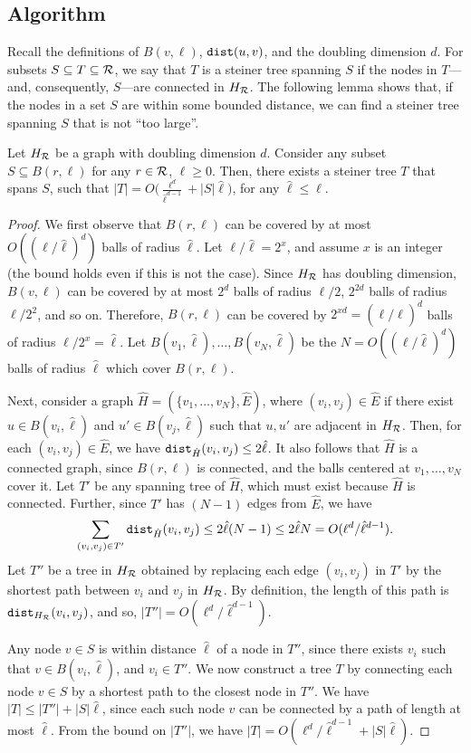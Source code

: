 \subsection{Algorithm \algosubmod{}}
Recall the definitions of $B(v, \ell)$, $\texttt{dist}(u, v)$, and the doubling dimension $d$. For subsets $S\subseteq T \subseteq \mathcal{R}$, we say that $T$ is a steiner tree spanning $S$ if the nodes in $T$---and, consequently, $S$---are connected in $H_{\mathcal{R}}$. The following lemma shows that, if the nodes in a set $S$ are within some bounded distance, we can find a steiner tree spanning $S$ that is not ``too large''.

\begin{lemma}
\label{lemma:udg}
Let $H_{\mathcal{R}}$ be a graph with doubling dimension $d$.
Consider any subset $S\subseteq B(r, \ell)$ for any $r\in\mathcal{R}$, $\ell\geq 0$.
Then, there exists a steiner tree $T$ that spans $S$, such that $|T|=O\Big(\frac{\ell^d}{\hat{\ell}^{d-1}}+|S|\hat{\ell}\Big)$, for any $\hat{\ell}\leq\ell$.
\end{lemma}
\begin{proof} 
We first observe that $B(r, \ell)$ can be covered by at most $O((\ell/\hat{\ell})^d)$ balls of radius $\hat{\ell}$. Let $\ell/\hat{\ell}=2^x$, and assume $x$ is an integer (the bound holds even if this is not the case). Since $H_{\mathcal{R}}$ has doubling dimension, $B(v, \ell)$ can be covered by at most $2^d$ balls of radius $\ell/2$, $2^{2d}$ balls of radius $\ell/2^2$, and so on. Therefore, $B(r, \ell)$ can be covered by $2^{xd}=(\ell/\hat{\ell})^d$ balls of radius $\ell/2^x=\hat{\ell}$. Let $B(v_1,\hat{\ell}),\ldots,B(v_N,\hat{\ell})$ be the $N=O((\ell/\hat{\ell})^d)$ balls of radius $\hat{\ell}$ which cover $B(r, \ell)$.

Next, consider a graph $\hat{H}=(\{v_1,\ldots,v_N\},\hat{E})$, where $(v_i, v_j)\in\hat{E}$ if there exist $u\in B(v_i, \hat{\ell})$ and $u'\in B(v_j, \hat{\ell})$ such that $u, u'$ are adjacent in $H_{\mathcal{R}}$. Then, for each $(v_i, v_j)\in \hat{E}$, we have $\texttt{dist}_{\hat{H}}(v_i, v_j)\leq 2\hat{\ell}$. 
It also follows that $\hat{H}$ is a connected graph, since $B(r, \ell)$ is connected, and the balls centered at $v_1,\ldots,v_N$ cover it. Let $T'$ be any spanning tree of $\hat{H}$, which must exist because $\hat{H}$ is connected. Further, since $T'$ has $(N-1)$ edges from $\hat{E}$, we have $$
\sum_{(v_i, v_j)\in T'}\texttt{dist}_{\hat{H}}(v_i, v_j)\leq 2\hat{\ell}(N-1)\leq 2\hat{\ell}N=O(\ell^d/\hat{\ell}^{d-1}).
$$
Let $T''$ be a tree in $H_{\mathcal{R}}$ obtained by replacing each edge $(v_i, v_j)$ in $T'$ by the shortest path between $v_i$ and $v_j$ in $H_{\mathcal{R}}$. By definition, the length of this path is $\texttt{dist}_{H_{\mathcal{R}}}(v_i, v_j)$, and so, $|T''|=O(\ell^d/\hat{\ell}^{d-1})$.

Any node $v\in S$ is within distance $\hat{\ell}$ of a node in $T''$, since there exists $v_i$ such that $v\in B(v_i, \hat{\ell})$, and $v_i\in T''$. We now construct a tree $T$ by connecting each node $v\in S$ by a shortest path to the closest node in $T''$. We have $|T|\leq |T''|+|S|\hat{\ell}$, since each such node $v$ can be connected by a path of length at most $\hat{\ell}$. From the bound on $|T''|$, we have $|T|=O(\ell^d/\hat{\ell}^{d-1}+|S|\hat{\ell})$.
\end{proof}

